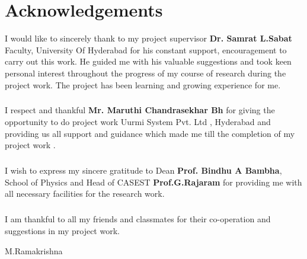 
\chapter*{\centering Acknowledgements}
I would like to sincerely thank to my project supervisor \textbf{Dr. Samrat L.Sabat} Faculty,
University Of Hyderabad for his constant support, encouragement to carry out this work.
He guided me with his valuable suggestions and took keen personal interest throughout the
progress of my course of research during the project work. The project has been learning
and growing experience for me.
\paragraph*{}I respect and thankful \textbf{Mr. Maruthi Chandrasekhar Bh} for giving the opportunity to do project
work Uurmi System Pvt. Ltd , Hyderabad and providing us all support and guidance which
made me till the completion of my project work .
\paragraph*{}I wish to express my sincere gratitude to Dean \textbf{Prof. Bindhu A Bambha}, School of Physics
and Head of CASEST \textbf{Prof.G.Rajaram} for providing me with all necessary facilities for the
research work.
\paragraph*{}I am thankful to all my friends and classmates for their co-operation and suggestions in
my project work.
\vfill
\begin{flushright}
M.Ramakrishna
\end{flushright} 